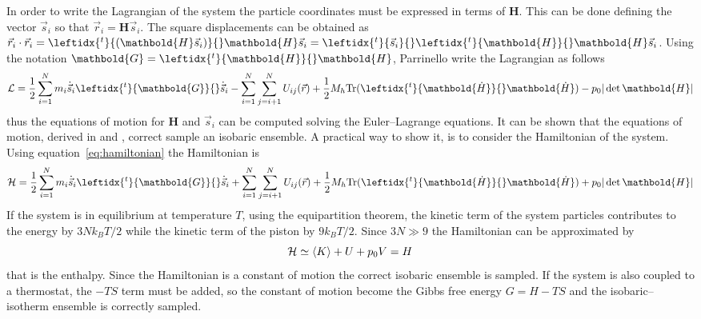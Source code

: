In order to write the Lagrangian of the system the particle coordinates must be expressed in terms of
$\mathbold{H}$. This can be done defining the vector $\vec s_i$ so that $\vec r_i =  \mathbold{H} \vec s_i$. The
square displacements can be obtained as $\vec r_i \cdot \vec r_i = \leftidx{^t}{ (\mathbold{H} \vec s_i)}{}  \mathbold{H} \vec s_i = \leftidx{^t}{\vec s_i}{} \leftidx{^t}{ \mathbold{H}}{}  \mathbold{H} \vec s_i$. Using the 
notation $\mathbold{G} = \leftidx{^t}{ \mathbold{H}}{} \mathbold{H}$, Parrinello \etal write the Lagrangian as 
follows
\begin{equation*}
	\mathcal{L} = \frac{1}{2}\sum_{i=1}^N m_i \dot{\vec s}_i \leftidx{^t}{\mathbold{G}}{} \dot{\vec s}_i - \sum_{i=1}^N \sum_{j=i+1}^N U_{ij}(\vec r) +  \frac{1}{2} M_h \text{Tr}(\leftidx{^t}{\mathbold{\dot H}}{} \mathbold{\dot H} ) -  p_0 |\det \mathbold{H}|
\end{equation*}
thus the equations of motion for $ \mathbold{H}$ and $\vec s_i$ can be computed solving the Euler--Lagrange
equations. It can be shown that the equations of motion, derived in \cite{ParrinelloBarostat1} and
\cite{ParrinelloBarostat2}, correct sample an isobaric ensemble. A practical way to show it, is to consider the
Hamiltonian of the system. Using equation~\eqref{eq:hamiltonian} the Hamiltonian is
\begin{equation*}
	\mathcal{H} = \frac{1}{2}\sum_{i=1}^N m_i \dot{\vec s}_i \leftidx{^t}{\mathbold{G}}{} \dot{\vec s}_i + \sum_{i=1}^N \sum_{j=i+1}^N U_{ij}(\vec r) +  \frac{1}{2} M_h \text{Tr}( \leftidx{^t}{\mathbold{\dot H}}{} \mathbold{\dot H} ) + p_0 |\det\mathbold{H}|
\end{equation*}
If the system is in equilibrium at temperature $T$, using the equipartition theorem, the kinetic term of the
system particles contributes to the energy by $3Nk_BT/2$ while the kinetic term of the piston by $9k_BT/2$. Since
$3N \gg 9$ the Hamiltonian can be approximated by
\begin{equation*}
	\mathcal{H} \simeq \left \langle K \right \rangle + U + p_0 V = H
\end{equation*}
that is the enthalpy. Since the Hamiltonian is a constant of motion the correct isobaric ensemble is sampled. If
the system is also coupled to a thermostat, the $-TS$ term must be added, so the constant of motion become the
Gibbs free energy $G = H - TS$ and the isobaric--isotherm ensemble is correctly sampled.

